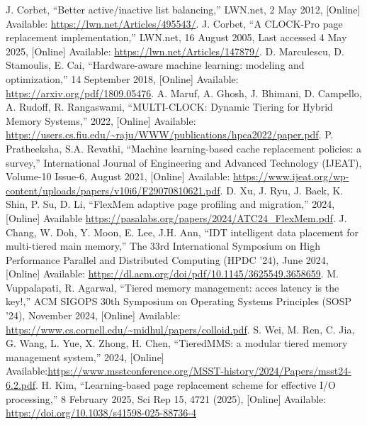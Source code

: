 \documentclass[conference]{IEEEtran}
\begin{document}
\begin{thebibliography}{00}
 J. Corbet, ``Better active/inactive list balancing,'' LWN.net, 2 May 2012, [Online] Available: \url{https://lwn.net/Articles/495543/}.
 J. Corbet, ``A CLOCK-Pro page replacement implementation,'' LWN.net, 16 August 2005, Last accessed 4 May 2025, [Online] Available: \url{https://lwn.net/Articles/147879/}.
 D. Marculescu, D. Stamoulis, E. Cai, ``Hardware-aware machine learning: modeling and optimization,'' 14 September 2018, [Online] Available: \url{https://arxiv.org/pdf/1809.05476}.
 A. Maruf, A. Ghosh, J. Bhimani, D. Campello, A. Rudoff, R. Rangaswami, ``MULTI-CLOCK: Dynamic Tiering for Hybrid Memory Systems,'' 2022, [Online] Available: \url{https://users.cs.fiu.edu/~raju/WWW/publications/hpca2022/paper.pdf}.
 P. Pratheeksha, S.A. Revathi, ``Machine learning-based cache replacement policies: a survey,'' International Journal of Engineering and Advanced Technology (IJEAT), Volume-10 Issue-6, August 2021, [Online] Available: \url{https://www.ijeat.org/wp-content/uploads/papers/v10i6/F29070810621.pdf}.
 D. Xu, J. Ryu, J. Baek, K. Shin, P. Su, D. Li, ``FlexMem adaptive page profiling and migration,'' 2024, [Online] Available \url{https://pasalabs.org/papers/2024/ATC24_FlexMem.pdf}.
 J. Chang, W. Doh, Y. Moon, E. Lee, J.H. Ann, ``IDT intelligent data placement for multi-tiered main memory,'' The 33rd International Symposium on High Performance Parallel and Distributed Computing (HPDC ’24), June 2024, [Online] Available: \url{https://dl.acm.org/doi/pdf/10.1145/3625549.3658659}.
 M. Vuppalapati, R. Agarwal, ``Tiered memory management: acces latency is the key!,'' ACM SIGOPS 30th Symposium on Operating Systems Principles (SOSP ’24), November 2024, [Online] Available: \url{https://www.cs.cornell.edu/~midhul/papers/colloid.pdf}.
 S. Wei, M. Ren, C. Jia, G. Wang, L. Yue, X. Zhong, H. Chen, ``TieredMMS: a modular tiered memory management system,'' 2024, [Online] Available:\url{https://www.msstconference.org/MSST-history/2024/Papers/msst24-6.2.pdf}.
 H. Kim, ``Learning-based page replacement scheme for effective I/O processing,'' 8 February 2025, Sci Rep 15, 4721 (2025), [Online] Available: \url{https://doi.org/10.1038/s41598-025-88736-4}
\end{thebibliography}
\end{document}
